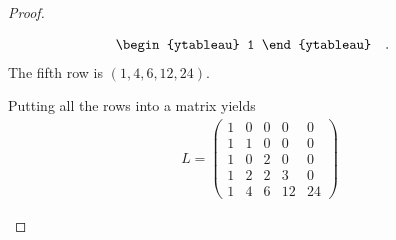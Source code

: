 \documentclass[12pt]{extarticle}
\newcommand{\<}{\langle}
\renewcommand{\>}{\rangle}
\theoremstyle{definition}
\begin{document}
\begin{proof}
\begin{enumerate}
\begin{itemize}
\begin{align*}
\begin{ytableau}
          1
        \end{ytableau}\quad.\quad
      \end{align*}
      The fifth row is $(1,4,6,12,24)$.
    \end{itemize}
    Putting all the rows into a matrix yields
    \begin{align*}
      L = 
      \begin{pmatrix}
        1 & 0 & 0 & 0 & 0 \\
        1 & 1 & 0 & 0 & 0 \\
        1 & 0 & 2 & 0 & 0 \\
        1 & 2 & 2 & 3 & 0 \\
        1 & 4 & 6 & 12 & 24
      \end{pmatrix}
    \end{align*}
  \end{enumerate}
\end{proof}
\end{document}
